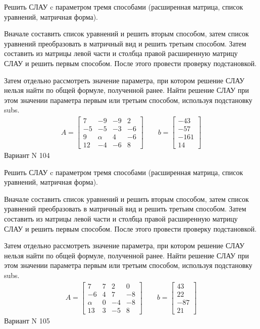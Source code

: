 \documentclass[11pt]{report}
\begin{document}
Решить СЛАУ c параметром тремя способами (расширенная матрица, список уравнений, матричная форма).

Вначале составить список уравнений и решить вторым способом,
затем список уравнений преобразовать в матричный вид и решить третьим способом.
Затем составить из матрицы левой части и столбца правой расширенную матрицу СЛАУ и решить первым способом.
После этого провести проверку подстановкой.

Затем отдельно рассмотреть значение параметра, при котором решение СЛАУ нельзя найти по общей формуле,
полученной ранее.
Найти решение СЛАУ при этом значении параметра первым или третьим способом, используя подстановку subs.
\begin{align*}
    A = \left[\begin{matrix}7 & -9 & -9 & 2\\-5 & -5 & -3 & -6\\9 & \alpha & 4 & -6\\12 & -4 & -6 & 8\end{matrix}\right]
\qquad b = \left[\begin{matrix}-43\\-57\\-161\\14\end{matrix}\right]
\end{align*}
\newpage
Вариант N 104


Решить СЛАУ c параметром тремя способами (расширенная матрица, список уравнений, матричная форма).

Вначале составить список уравнений и решить вторым способом,
затем список уравнений преобразовать в матричный вид и решить третьим способом.
Затем составить из матрицы левой части и столбца правой расширенную матрицу СЛАУ и решить первым способом.
После этого провести проверку подстановкой.

Затем отдельно рассмотреть значение параметра, при котором решение СЛАУ нельзя найти по общей формуле,
полученной ранее.
Найти решение СЛАУ при этом значении параметра первым или третьим способом, используя подстановку subs.
\begin{align*}
    A = \left[\begin{matrix}7 & 7 & 2 & 0\\-6 & 4 & 7 & -8\\\alpha & 0 & -4 & -8\\13 & 3 & -5 & 8\end{matrix}\right]
\qquad b = \left[\begin{matrix}43\\22\\-87\\21\end{matrix}\right]
\end{align*}
\newpage
Вариант N 105
\end{document}
